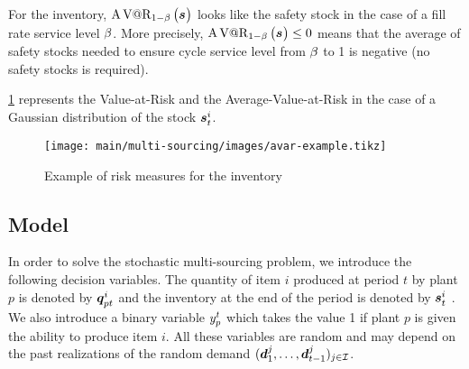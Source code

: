 For the inventory, $\AVaR_{1-\servicelvl}\bracket{\va\inventory}$ looks like the safety stock in the case of a fill rate service level $\beta$.
More precisely, $\AVaR_{1-\servicelvl}\bracket{\va\inventory}\le 0$ means that the average of safety stocks needed to ensure cycle service level from $\beta$ to 1 is negative (\ie no safety stocks is required).


\cref{fig:avar-examples} represents the Value-at-Risk and the Average-Value-at-Risk in the case of a Gaussian distribution of the stock $\va\inventory_t^i$.


\begin{figure}[h]
  \centering
  \texttt{[image: main/multi-sourcing/images/avar-example.tikz]}
  \caption{Example of risk measures for the inventory}
  \label{fig:avar-examples}
\end{figure}


\subsection{Model}


In order to solve the stochastic multi-sourcing problem, we introduce the following decision variables.
The quantity of item $i$ produced at period $t$ by plant $p$ is denoted by $\va\quantity_{pt}^i$ and the inventory at the end of the period is denoted by $\va\inventory_t^i$ .
We also introduce a binary variable $y_p^t$ which takes the value 1 if plant $p$ is given the ability to produce item $i$.
All these variables are random and may depend on the past realizations of the random demand $(\va\demand_1^j,\ldots,\va\demand_{t-1}^j)_{j\in\REF}$.


